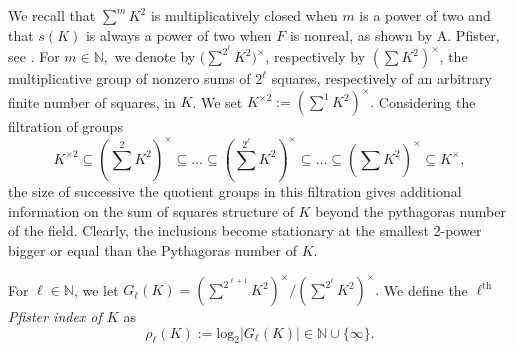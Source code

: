 \documentclass[a4paper,12pt,reqno]{amsart}
\theoremstyle{definition}
\numberwithin{equation}{thm}
\begin{document}
We recall that $\sum^m K^2$ is multiplicatively closed when $m$ is a power of two and that $s(K)$ is always a power of two when $F$ is nonreal, as shown by A. Pfister, see \cite[Theorem 1.1, Theorem 2.2]{Lam}. For $m\in\mathbb{N},$ we denote by $\big(\sum^{2^\ell} \!\! K^2 \big)^\times\!\!$, respectively by $(\sum K^2)^\times$, the multiplicative group of nonzero sums of $2^\ell$ squares, respectively of an arbitrary finite number of squares, in $K$. We set $K^{\times 2}:=\left(\sum^{1}K^{2}\right)^{\times}.$ Considering the filtration of groups
$$ K^{\times 2} \subseteq \left(\sum^{2} K^2\right)^\times \subseteq \ldots \subseteq \left(\sum^{2^\ell} K^2\right)^\times\subseteq \ldots \subseteq \left(\sum^{\phantom{\infty}} K^2\right)^\times \subseteq K^\times,$$
the size of successive the quotient groups in this filtration gives additional information on the sum of squares structure of $K$ beyond the pythagoras number of the field. Clearly, the inclusions become stationary at the smallest $2$-power bigger or equal than the Pythagoras number of $K$.

For $\ell\in\mathbb{N}$, we let $G_{\ell}(K)=\left(\sum^{2^{\ell+1}} K^2\right)^\times/ \left(\sum^{2^{\ell}}  K^2\right)^{\times}.$ We define the \textit{$\ell^{\text{th}}$ Pfister index of $K$} as $$\rho_\ell(K):=\mathrm{log}_2 
 \left\vert G_{\ell}(K)\right\vert \in \mathbb{N} \cup \{\infty\}.$$
 
\end{document}
